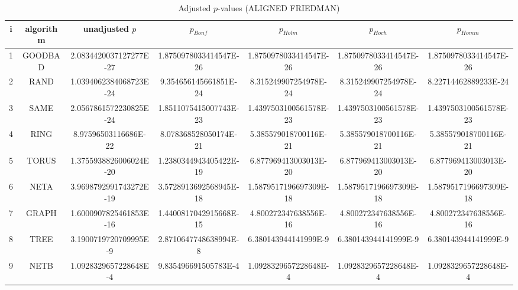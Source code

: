 \documentclass[a4paper,10pt]{article}
\begin{document}
\begin{landscape}
\begin{table}[!htp]
\centering\scriptsize
\caption{Adjusted $p$-values (ALIGNED FRIEDMAN)}
\begin{tabular}{ccccccc}
i&algorithm&unadjusted $p$&$p_{Bonf}$&$p_{Holm}$&$p_{Hoch}$&$p_{Homm}$\\
\hline
1& GOODBAD&2.0834420037127277E-27&1.8750978033414547E-26&1.8750978033414547E-26&1.8750978033414547E-26&1.8750978033414547E-26\\
2& RAND&1.0394062384068723E-24&9.354656145661851E-24&8.315249907254978E-24&8.315249907254978E-24&8.22714462889233E-24\\
3& SAME&2.0567861572230825E-24&1.8511075415007743E-23&1.4397503100561578E-23&1.4397503100561578E-23&1.4397503100561578E-23\\
4& RING&8.97596503116686E-22&8.078368528050174E-21&5.385579018700116E-21&5.385579018700116E-21&5.385579018700116E-21\\
5& TORUS&1.3755938826006024E-20&1.2380344943405422E-19&6.877969413003013E-20&6.877969413003013E-20&6.877969413003013E-20\\
6& NETA&3.9698792991743272E-19&3.5728913692568945E-18&1.5879517196697309E-18&1.5879517196697309E-18&1.5879517196697309E-18\\
7& GRAPH&1.6000907825461853E-16&1.4400817042915668E-15&4.800272347638556E-16&4.800272347638556E-16&4.800272347638556E-16\\
8& TREE&3.1900719720709995E-9&2.8710647748638994E-8&6.380143944141999E-9&6.380143944141999E-9&6.380143944141999E-9\\
9& NETB&1.0928329657228648E-4&9.835496691505783E-4&1.0928329657228648E-4&1.0928329657228648E-4&1.0928329657228648E-4\\
\hline
\end{tabular}
\end{table}


\end{landscape}
\end{document}
